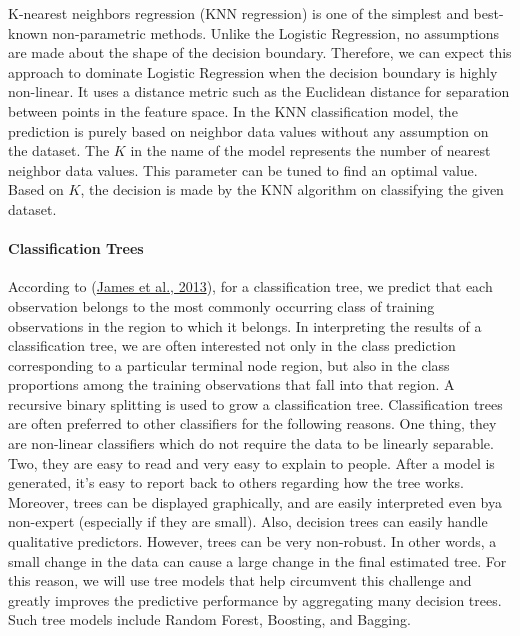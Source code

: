 \documentclass[
  10pt,
]{article}
\begin{document}
K-nearest neighbors regression (KNN regression) is one of the simplest and best-known
non-parametric methods. Unlike the Logistic Regression, no assumptions are made about the shape of the decision boundary. Therefore, we can expect this approach to dominate Logistic Regression when the decision boundary is highly non-linear. It uses a distance metric such as the Euclidean distance for separation between points in the feature space. In the KNN classification model, the prediction is purely based on neighbor data values without any assumption on the dataset. The \(K\) in the name of the model represents the number of nearest neighbor data values. This parameter can be tuned to find an optimal value. Based on \(K\), the decision is made by the KNN algorithm on classifying the given dataset.

\hypertarget{classification-trees}{%
\paragraph{Classification Trees}\label{classification-trees}}

According to (\protect\hyperlink{ref-james2013introduction}{James et al., 2013}), for a classification tree, we predict that each observation belongs to the most commonly occurring class of training observations in the region to which it belongs. In interpreting the results of a classification tree, we are often interested not only in the class prediction corresponding to a particular terminal node region, but also in the class proportions among the training observations that fall into that region. A recursive binary splitting is used to grow a classification tree. Classification trees are often preferred to other classifiers for the following reasons. One thing, they are non-linear classifiers which do not require the data to be linearly separable. Two, they are easy to read and very easy to explain to people. After a model is generated, it's easy to report back to others regarding how the tree works. Moreover, trees can be displayed graphically, and are easily interpreted even bya non-expert (especially if they are small). Also, decision trees can easily handle qualitative predictors. However, trees can be very non-robust. In other words, a small change in the data can cause a large change in the final estimated tree. For this reason, we will use tree models that help circumvent this challenge and greatly improves the predictive performance by aggregating many decision trees. Such tree models include Random Forest, Boosting, and Bagging.
\end{document}
